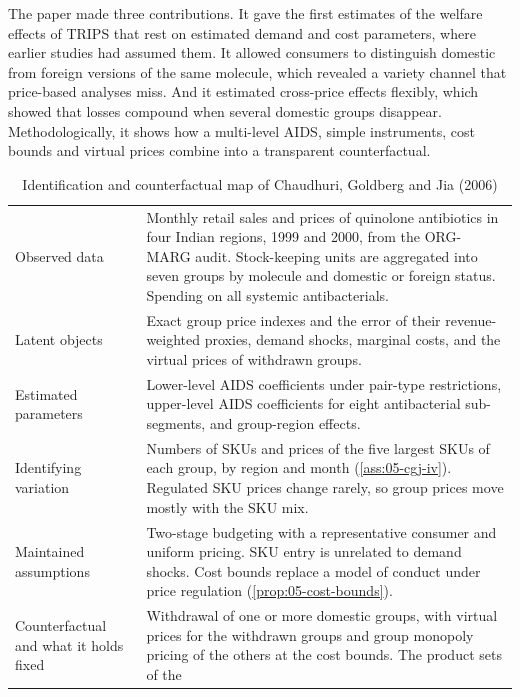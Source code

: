 The paper made three contributions. It gave the first estimates of the welfare effects of TRIPS that rest on estimated
demand and cost parameters, where earlier studies had assumed them. It allowed consumers to distinguish domestic from
foreign versions of the same molecule, which revealed a variety channel that price-based analyses miss. And it
estimated cross-price effects flexibly, which showed that losses compound when several domestic groups disappear.
Methodologically, it shows how a multi-level AIDS, simple instruments, cost bounds and virtual prices combine into a
transparent counterfactual.

\begin{table}[htbp]
\centering
\caption{Identification and counterfactual map of Chaudhuri, Goldberg and Jia (2006)}
\label{tab:05-cgj-map}
\footnotesize
\renewcommand{\arraystretch}{1.1}
\begin{tabularx}{\textwidth}{@{}>{\raggedright\arraybackslash}p{2.6cm}>{\raggedright\arraybackslash}X@{}}
\toprule
Observed data & Monthly retail sales and prices of quinolone antibiotics in four Indian regions, 1999 and
  2000, from the ORG-MARG audit. Stock-keeping units are aggregated into seven groups by molecule and
  domestic or foreign status. Spending on all systemic antibacterials. \\
\addlinespace
Latent objects & Exact group price indexes and the error of their revenue-weighted proxies, demand shocks,
  marginal costs, and the virtual prices of withdrawn groups. \\
\addlinespace
Estimated parameters & Lower-level AIDS coefficients under pair-type restrictions, upper-level AIDS
  coefficients for eight antibacterial sub-segments, and group-region effects. \\
\addlinespace
Identifying variation & Numbers of SKUs and prices of the five largest SKUs of each group, by region and
  month (\cref{ass:05-cgj-iv}). Regulated SKU prices change rarely, so group prices move mostly with the
  SKU mix. \\
\addlinespace
Maintained assumptions & Two-stage budgeting with a representative consumer and uniform pricing. SKU entry
  is unrelated to demand shocks. Cost bounds replace a model of conduct under price regulation
  (\cref{prop:05-cost-bounds}). \\
\addlinespace
Counterfactual and what it holds fixed & Withdrawal of one or more domestic groups, with virtual prices for
  the withdrawn groups and group monopoly pricing of the others at the cost bounds. The product sets of the

\end{tabularx}
\end{table}
